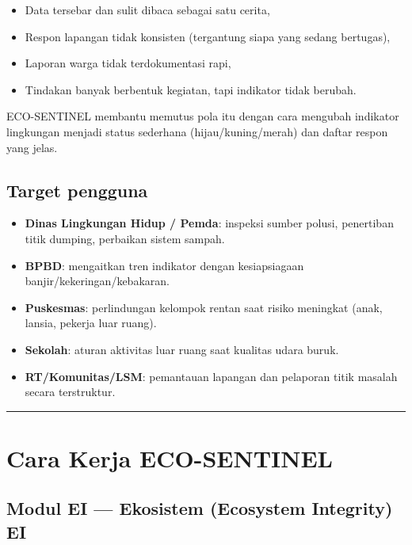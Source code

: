 \documentclass[
  letterpaper,
  DIV=11,
  numbers=noendperiod]{scrreprt}
\providecommand{\tightlist}{%
  \setlength{\itemsep}{0pt}\setlength{\parskip}{0pt}}
\begin{document}
\begin{itemize}
\tightlist
\item
  Data tersebar dan sulit dibaca sebagai satu cerita,
\item
  Respon lapangan tidak konsisten (tergantung siapa yang sedang
  bertugas),
\item
  Laporan warga tidak terdokumentasi rapi,
\item
  Tindakan banyak berbentuk kegiatan, tapi indikator tidak berubah.
\end{itemize}

ECO-SENTINEL membantu memutus pola itu dengan cara mengubah indikator
lingkungan menjadi status sederhana (hijau/kuning/merah) dan daftar
respon yang jelas.

\subsection{Target pengguna}\label{target-pengguna}

\begin{itemize}
\tightlist
\item
  \textbf{Dinas Lingkungan Hidup / Pemda}: inspeksi sumber polusi,
  penertiban titik dumping, perbaikan sistem sampah.
\item
  \textbf{BPBD}: mengaitkan tren indikator dengan kesiapsiagaan
  banjir/kekeringan/kebakaran.
\item
  \textbf{Puskesmas}: perlindungan kelompok rentan saat risiko meningkat
  (anak, lansia, pekerja luar ruang).
\item
  \textbf{Sekolah}: aturan aktivitas luar ruang saat kualitas udara
  buruk.
\item
  \textbf{RT/Komunitas/LSM}: pemantauan lapangan dan pelaporan titik
  masalah secara terstruktur.
\end{itemize}

\begin{center}\rule{0.5\linewidth}{0.5pt}\end{center}

\section{Cara Kerja ECO-SENTINEL}\label{cara-kerja-eco-sentinel}

\subsection{\texorpdfstring{Modul EI --- Ekosistem (Ecosystem Integrity)
{EI}}{Modul EI --- Ekosistem (Ecosystem Integrity) EI}}\label{modul-ei-ekosistem-ecosystem-integrity-ei}
\end{document}
